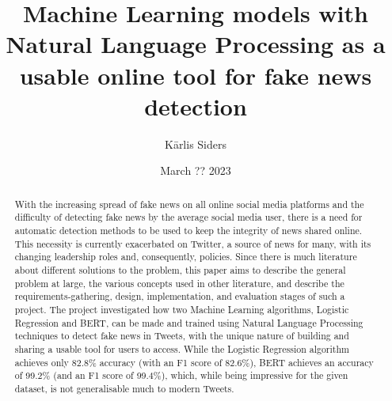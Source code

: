 \documentclass{l4proj}
\begin{document}
\title{Machine Learning models with Natural Language Processing as a usable online tool for fake news detection}
\author{Kārlis Siders}
\date{March ?? 2023}

\maketitle

\begin{abstract}
    With the increasing spread of fake news on all online social media platforms and the difficulty of detecting fake news by the average social media user, there is a need for automatic detection methods to be used to keep the integrity of news shared online. This necessity is currently exacerbated on Twitter, a source of news for many, with its changing leadership roles and, consequently, policies. Since there is much literature about different solutions to the problem, this paper aims to describe the general problem at large, the various concepts used in other literature, and describe the requirements-gathering, design, implementation, and evaluation stages of such a project. The project investigated how two Machine Learning algorithms, Logistic Regression and BERT, can be made and trained using Natural Language Processing techniques to detect fake news in Tweets, with the unique nature of building and sharing a usable tool for users to access. While the Logistic Regression algorithm achieves only 82.8\% accuracy (with an F1 score of 82.6\%), BERT achieves an accuracy of 99.2\% (and an F1 score of 99.4\%), which, while being impressive for the given dataset, is not generalisable much to modern Tweets.
    
\end{abstract}


\end{document}
